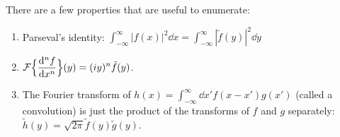 There are a few properties that are useful to enumerate:
\begin{enumerate}
    \item Parseval's identity: $\displaystyle \int_{-\infty}^{\infty} |f(x)|^2 \dd{x} = \int_{-\infty}^{\infty} |\tilde{f}(y)|^2 \dd{y}$
    \item $\displaystyle \mathcal{F}\Big\{ \dv[n]{f}{x} \Big\} (y) = (iy)^{n} \tilde{f}(y)$.
    \item The Fourier transform of $h(x) = \int_{-\infty}^{\infty} \dd{x'} f(x - x')g(x')$ (called a convolution) is just the product of the transforms of $f$ and $g$ separately: $\tilde{h}(y) = \sqrt{2 \pi} \tilde{f}(y) \tilde{g}(y)$.
\end{enumerate}


